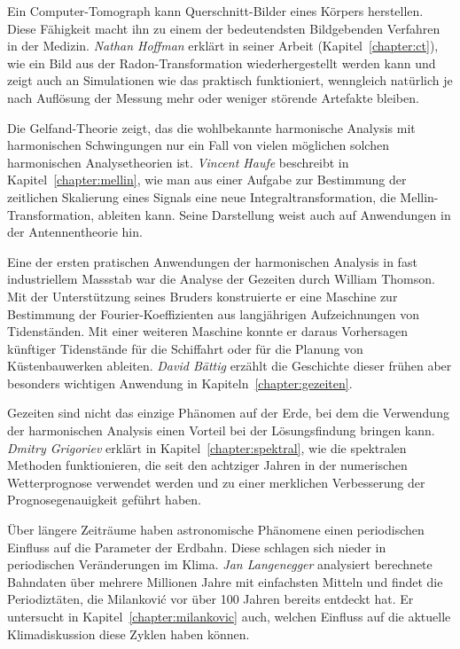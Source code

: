 Ein Computer-Tomograph kann Querschnitt-Bilder eines Körpers
herstellen.
%
Diese Fähigkeit macht ihn zu einem der bedeutendsten Bildgebenden
Verfahren in der Medizin.
{\em Nathan Hoffman} erklärt in seiner Arbeit (Kapitel~\ref{chapter:ct}),
%
wie ein Bild aus der
Radon-Transformation wiederhergestellt werden kann und zeigt auch
%
an Simulationen wie das praktisch funktioniert, wenngleich natürlich
je nach Auflösung der Messung mehr oder weniger störende Artefakte bleiben.

Die Gelfand-Theorie zeigt, das die wohlbekannte harmonische
%
Analysis mit harmonischen Schwingungen nur ein Fall von vielen
möglichen solchen harmonischen Analysetheorien ist.
{\em Vincent Haufe} beschreibt in Kapitel~\ref{chapter:mellin},
%
wie man aus einer Aufgabe
zur Bestimmung der zeitlichen Skalierung eines Signals eine
neue Integraltransformation, die Mellin-Transformation, ableiten 
%
kann.
Seine Darstellung weist auch auf Anwendungen in der Antennentheorie
hin.

Eine der ersten pratischen Anwendungen der harmonischen Analysis in
fast industriellem Massstab war die Analyse der Gezeiten durch
William Thomson.
Mit der Unterstützung seines Bruders konstruierte er eine Maschine zur
Bestimmung der Fourier-Koeffizienten aus langjährigen Aufzeichnungen
von Tidenständen.
Mit einer weiteren Maschine konnte er daraus Vorhersagen künftiger
Tidenstände für die Schiffahrt oder für die Planung von Küstenbauwerken
ableiten.
{\em David Bättig} erzählt die Geschichte dieser frühen aber besonders
wichtigen Anwendung in Kapiteln~\ref{chapter:gezeiten}.
%
%

Gezeiten sind nicht das einzige Phänomen auf der Erde, bei dem die
Verwendung der harmonischen Analysis einen Vorteil bei der Lösungsfindung
bringen kann.
{\em Dmitry Grigoriev} erklärt in Kapitel~\ref{chapter:spektral},
%
wie die spektralen Methoden funktionieren, die seit den achtziger Jahren
in der numerischen Wetterprognose verwendet werden und zu einer
merklichen Verbesserung der Prognosegenauigkeit geführt haben.

Über längere Zeiträume haben astronomische Phänomene einen periodischen
Einfluss auf die Parameter der Erdbahn.
Diese schlagen sich nieder in periodischen Veränderungen im Klima.
{\em Jan Langenegger} analysiert berechnete Bahndaten über mehrere
%
Millionen Jahre mit einfachsten Mitteln und findet die Periodiztäten,
die Milankovi\'c vor über 100 Jahren bereits entdeckt hat.
Er untersucht in Kapitel~\ref{chapter:milankovic} auch, welchen Einfluss
auf die aktuelle Klimadiskussion diese Zyklen haben können.

